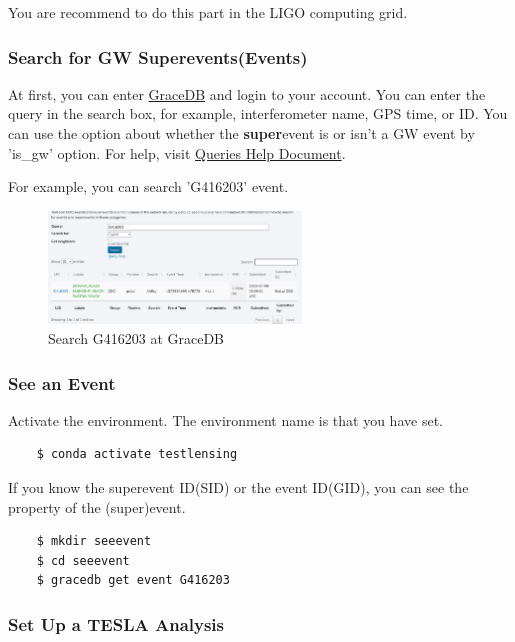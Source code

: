 You are recommend to do this part in the LIGO computing grid.

\subsubsection{Search for GW Superevents(Events)}

At first, you can enter \href{https://gracedb.ligo.org/search/}{GraceDB} and login to your account. You can enter the query in the search box, for example, interferometer name, GPS time, or ID. You can use the option about whether the \textbf{super}event is or isn't a GW event by 'is\_gw' option. For help, visit \href{https://gracedb.ligo.org/documentation/queries.html}{Queries Help Document}.

For example, you can search 'G416203' event.

\begin{figure}[h]
\centering
\includegraphics[width=0.6\textwidth]{figs/search.png}
\caption{Search G416203 at GraceDB}
\end{figure}

\subsubsection{See an Event}

Activate the environment. The environment name is that you have set.

\begin{verbatim}
    $ conda activate testlensing
\end{verbatim}

If you know the superevent ID(SID) or the event ID(GID), you can see the property of the (super)event.

\begin{verbatim}
    $ mkdir seeevent
    $ cd seeevent
    $ gracedb get event G416203
\end{verbatim}

\subsubsection{Set Up a TESLA Analysis}

